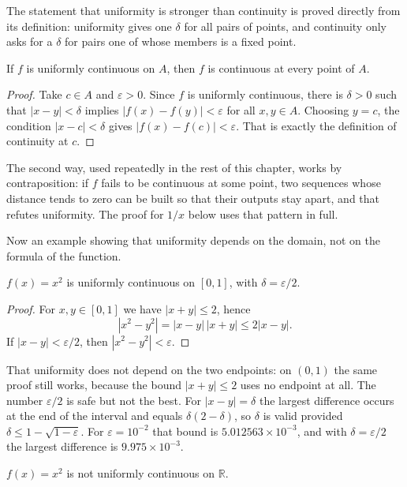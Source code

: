 The statement that uniformity is stronger than continuity is proved directly from its
definition: uniformity gives one $\delta$ for all pairs of points, and
continuity only asks for a $\delta$ for pairs one of whose members is a fixed
point.

\begin{proposisi}
If $f$ is uniformly continuous on $A$, then $f$ is continuous at every point of $A$.
\end{proposisi}

\begin{proof}
Take $c\in A$ and $\varepsilon>0$. Since $f$ is uniformly continuous, there is $\delta>0$
such that $|x-y|<\delta$ implies $|f(x)-f(y)|<\varepsilon$ for all $x,y\in A$.
Choosing $y=c$, the condition $|x-c|<\delta$ gives $|f(x)-f(c)|<\varepsilon$. That is
exactly the definition of continuity at $c$.
\end{proof}

The second way, used repeatedly in the rest of this chapter, works by contraposition: if
$f$ fails to be continuous at some point, two sequences whose distance tends to zero can
be built so that their outputs stay apart, and that refutes uniformity. The proof for
$1/x$ below uses that pattern in full.

Now an example showing that uniformity depends on the domain, not on the formula of the
function.

\begin{proposisi}
$f(x)=x^{2}$ is uniformly continuous on $[0,1]$, with $\delta=\varepsilon/2$.
\end{proposisi}

\begin{proof}
For $x,y\in[0,1]$ we have $|x+y|\le 2$, hence
\[
|x^{2}-y^{2}|=|x-y|\,|x+y|\le 2|x-y| .
\]
If $|x-y|<\varepsilon/2$, then $|x^{2}-y^{2}|<\varepsilon$.
\end{proof}

That uniformity does not depend on the two endpoints: on $(0,1)$ the same proof still
works, because the bound $|x+y|\le 2$ uses no endpoint at all. The number
$\varepsilon/2$ is safe but not the best. For $|x-y|=\delta$ the largest difference
occurs at the end of the interval and equals $\delta(2-\delta)$, so $\delta$ is valid
provided $\delta\le 1-\sqrt{1-\varepsilon}$. For $\varepsilon=10^{-2}$ that bound is
$5.012563\times10^{-3}$, and with $\delta=\varepsilon/2$ the largest difference is
$9.975\times10^{-3}$.

\begin{proposisi}
$f(x)=x^{2}$ is not uniformly continuous on $\mathbb{R}$.
\end{proposisi}

